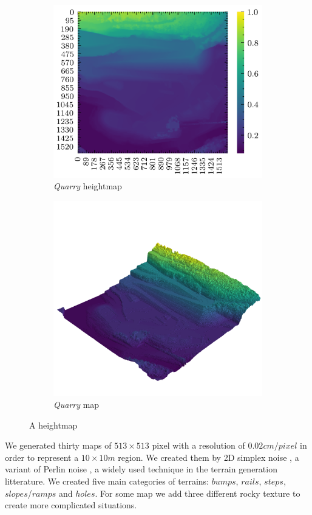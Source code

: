 \documentclass[../document.tex]{subfiles}
\begin{document}
\begin{figure}[H]
    \centering
        \begin{subfigure}[b]{0.45\textwidth}
            \includegraphics[width=\textwidth]{../img/hm/querry-big-10.png}
            \caption{\emph{Quarry} heightmap}
        \end{subfigure}
        \begin{subfigure}[b]{0.45\linewidth}
            \includegraphics[width=\textwidth]{../img/hm3d/querry-big-10.png}
            \caption{\emph{Quarry} map}
            \end{subfigure}    
    \caption{A heightmap}
    \end{figure}
We generated thirty maps of $513\times513$ pixel with a resolution of $0.02cm/pixel$ in order to represent a $10\times10m$ region. We created them by 2D simplex noise \cite{simplex}, a variant of Perlin noise \cite{perlin}, a widely used technique in the terrain generation litterature. We created five main categories of terrains: $bumps$, $rails$, $steps$, $slopes$/$ramps$ and $holes$. For some map we add three different rocky texture to create more complicated situations.
\end{document}
